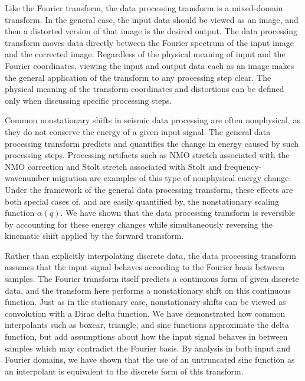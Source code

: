 Like the Fourier transform, the data processing transform is a mixed-domain transform.
In the general case, the input data should be viewed as an image, and then a distorted version of that image is the desired output.
The data processing transform moves data directly between the Fourier spectrum of the input image and the corrected image. 
Regardless of the physical meaning of input and the Fourier coordinates, viewing the input and output data each as an image makes the general application of the transform to any processing step clear.
The physical meaning of the transform coordinates and distortions can be defined only when discussing specific processing steps.

Common nonstationary shifts in seismic data processing are often nonphysical, as they do not conserve the energy of a given input signal.  
The general data processing transform predicts and quantifies the change in energy caused by such processing steps.  
Processing artifacts such as NMO stretch associated with the NMO correction and Stolt stretch associated with Stolt and frequency-wavenumber migration are examples of this type of nonphysical energy change.  
Under the framework of the general data processing transform, these effects are both special cases of, and are easily quantified by, the nonstationary scaling function $\alpha (q)$.  
We have shown that the data processing transform is reversible by accounting for these energy changes while simultaneously reversing the kinematic shift applied by the forward transform.

Rather than explicitly interpolating discrete data, the data processing transform assumes that the input signal behaves according to the Fourier basis between samples.  
The Fourier transform itself predicts a continuous form of given discrete data, and the transform here performs a nonstationary shift on this continuous function.  
Just as in the stationary case, nonstationary shifts can be viewed as convolution with a Dirac delta function.  
We have demonstrated how common interpolants such as boxcar, triangle, and sinc functions approximate the delta function, but add assumptions about how the input signal behaves in between samples which may contradict the Fourier basis.  
By analysis in both input and Fourier domains, we have shown that the use of an untruncated sinc function as an interpolant is equivalent to the discrete form of this transform.

